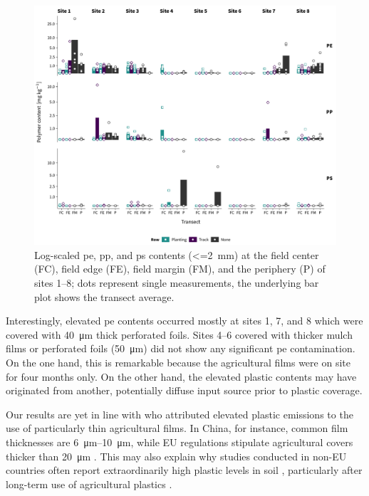\begin{figure}[t]
	\centering
	\includegraphics[width=\textwidth]{figures/py-screening}
	\caption[\Ac{pe}, \ac{pp}, and \ac{ps} contents (\SI{<=2}{\milli\meter}).]{Log-scaled \ac{pe}, \ac{pp}, and \ac{ps} contents (\SI{<=2}{\milli\meter}) at the field center (FC), field edge (FE), field margin (FM), and the periphery (P) of sites 1--8; dots represent single measurements, the underlying bar plot shows the transect average.}
	\label{fig:py-screening}
	\forceversofloat
\end{figure}

Interestingly, elevated \ac{pe} contents occurred mostly at sites 1, 7, and 8 which were covered with \SI{40}{\micro\meter} thick perforated foils. Sites 4--6 covered with thicker mulch films or perforated foils (\SI{50}{\micro\meter}) did not show any significant \ac{pe} contamination.
On the one hand, this is remarkable because the agricultural films were on site for four months only. On the other hand, the elevated plastic contents may have originated from another, potentially diffuse input source prior to plastic coverage.

Our results are yet in line with \citet{ZhangStatus2016} who attributed elevated plastic emissions to the use of particularly thin agricultural films. In China, for instance, common film thicknesses are \SIrange{6}{10}{\micro\meter}, while EU regulations stipulate agricultural covers thicker than \SI{20}{\micro\meter} \citep{EN13655Plastics2018}. This may also explain why studies conducted in non-EU countries often report extraordinarily high plastic levels in soil \citep{LiuWhite2014}, particularly after long-term use of agricultural plastics \citep{HuangAgricultural2020,ZhangDistribution2018}.

